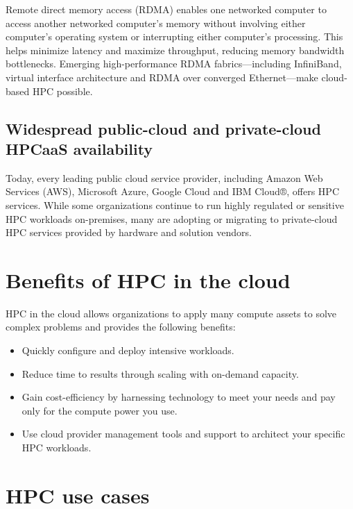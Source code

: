 \documentclass[11pt]{article}
\begin{document}
Remote direct memory access (RDMA) enables one networked computer to access another networked computer's memory without involving either computer's operating system or interrupting either computer's processing. This helps minimize latency and maximize throughput, reducing memory bandwidth bottlenecks. Emerging high-performance RDMA fabrics—including InfiniBand, virtual interface architecture and RDMA over converged Ethernet—make cloud-based HPC possible.

\subsection{Widespread public-cloud and private-cloud HPCaaS availability}

Today, every leading public cloud service provider, including Amazon Web Services (AWS), Microsoft Azure, Google Cloud and IBM Cloud®, offers HPC services. While some organizations continue to run highly regulated or sensitive HPC workloads on-premises, many are adopting or migrating to private-cloud HPC services provided by hardware and solution vendors.

\section{Benefits of HPC in the cloud}

HPC in the cloud allows organizations to apply many compute assets to solve complex problems and provides the following benefits:

\begin{itemize}
  \item Quickly configure and deploy intensive workloads.
  \item Reduce time to results through scaling with on-demand capacity.
  \item Gain cost-efficiency by harnessing technology to meet your needs and pay only for the compute power you use.
  \item Use cloud provider management tools and support to architect your specific HPC workloads.
\end{itemize}

\section{HPC use cases}
\end{document}
